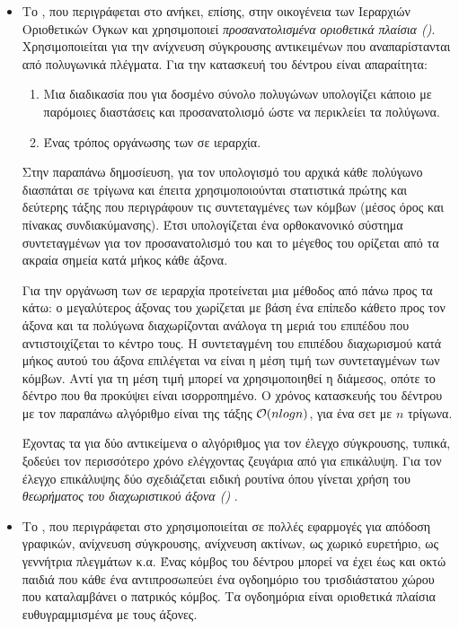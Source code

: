 \begin{itemize}
    \item Το , που περιγράφεται στο \cite{gottschalk1996obbtree}
    ανήκει, επίσης, στην οικογένεια των Ιεραρχιών Οριοθετικών Όγκων και χρησιμοποιεί 
    \textit{προσανατολισμένα οριοθετικά πλαίσια ()}. 
    Χρησιμοποιείται για την ανίχνευση σύγκρουσης αντικειμένων που αναπαρίστανται 
    από πολυγωνικά πλέγματα. 
    Για την κατασκευή του δέντρου είναι απαραίτητα: 
    \begin{enumerate}
        \item Μια διαδικασία που για δοσμένο σύνολο πολυγώνων υπολογίζει 
        κάποιο  με παρόμοιες διαστάσεις και προσανατολισμό
        ώστε να περικλείει τα πολύγωνα.
        \item Ένας τρόπος οργάνωσης των  σε ιεραρχία.
    \end{enumerate}
    Στην παραπάνω δημοσίευση, για τον υπολογισμό του  αρχικά κάθε πολύγωνο
    διασπάται σε τρίγωνα και έπειτα χρησιμοποιούνται στατιστικά
    πρώτης και δεύτερης τάξης που περιγράφουν τις συντεταγμένες των κόμβων
    (μέσος όρος και πίνακας συνδιακύμανσης).
    Έτσι υπολογίζεται ένα ορθοκανονικό σύστημα συντεταγμένων για τον προσανατολισμό 
    του  και το μέγεθος του ορίζεται από τα ακραία σημεία κατά μήκος κάθε άξονα.
    
    Για την οργάνωση των  σε ιεραρχία προτείνεται μια μέθοδος από 
    πάνω προς τα κάτω: ο μεγαλύτερος άξονας του 
    χωρίζεται με βάση ένα επίπεδο κάθετο προς τον άξονα και 
    τα πολύγωνα διαχωρίζονται ανάλογα τη μεριά του επιπέδου που αντιστοιχίζεται 
    το κέντρο τους.
    Η συντεταγμένη του επιπέδου διαχωρισμού κατά μήκος αυτού του άξονα
    επιλέγεται να είναι η μέση τιμή των συντεταγμένων των κόμβων.
    Αντί για τη μέση τιμή μπορεί να χρησιμοποιηθεί η διάμεσος, οπότε 
    το δέντρο που θα προκύψει είναι ισορροπημένο. 
    Ο χρόνος κατασκευής του δέντρου με τον παραπάνω αλγόριθμο είναι της 
    τάξης $\mathcal{O}(nlogn)$, για ένα σετ με $n$ τρίγωνα. 
    
    Έχοντας τα  για δύο αντικείμενα ο αλγόριθμος 
    για τον έλεγχο σύγκρουσης, τυπικά, ξοδεύει τον περισσότερο 
    χρόνο ελέγχοντας ζευγάρια από  για επικάλυψη.   
    Για τον έλεγχο επικάλυψης δύο  σχεδιάζεται ειδική ρουτίνα
    όπου γίνεται χρήση του \textit{θεωρήματος του διαχωριστικού άξονα 
    ()} 
    \cite{gottschalk1996separating}.

    \item Το , που περιγράφεται στο \cite{meagher1982geometric}
    χρησιμοποιείται σε πολλές εφαρμογές για απόδοση γραφικών, ανίχνευση σύγκρουσης, 
    ανίχνευση ακτίνων, ως χωρικό ευρετήριο, ως γεννήτρια πλεγμάτων κ.α. 
    Ένας κόμβος του δέντρου μπορεί να έχει έως και οκτώ παιδιά που κάθε ένα
    αντιπροσωπεύει ένα ογδοημόριο του τρισδιάστατου χώρου που καταλαμβάνει ο 
    πατρικός κόμβος. 
    Τα ογδοημόρια είναι οριοθετικά πλαίσια ευθυγραμμισμένα με τους άξονες.


\end{itemize}
